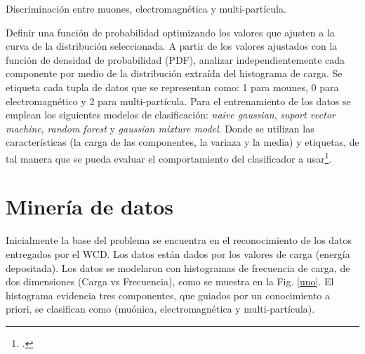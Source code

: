 \begin{algorithm}[h]
\small
\caption{Discriminación entre muones, electromagnética y multi-partícula.}
\label{Begin_Read}
\begin{algorithmic}[1]
\State Definir una función de probabilidad optimizando los valores que ajusten a la curva de la distribución seleccionada.
\State A partir de los valores ajustados con la función de densidad de probabilidad (PDF), analizar independientemente cada componente por medio de la distribución extraída del histograma de carga.
\State Se etiqueta cada tupla de datos que se  representan como: 1 para mounes, 0 para electromagnético y 2 para multi-partícula.
\State Para el entrenamiento de los datos se emplean los siguientes modelos de clasificación: \textit{naive gaussian}, \textit{suport vector machine}, \textit{random forest} y \textit{gaussian mixture model}. Donde se utilizan las características (la carga de las componentes, la variaza y la media) y etiquetas, de tal manera que se pueda evaluar el comportamiento del clasificador a usar\footcite{perez2005modelos}.
\Statex
\end{algorithmic}
  \vspace{-0.1cm}%
\end{algorithm}


\section{Minería de datos}
Inicialmente la base del problema se encuentra en el reconocimiento de los datos entregados por el WCD. Los datos están dados por los valores de carga (energía depositada). Los datos se modelaron con histogramas de frecuencia de carga, de dos dimensiones (Carga vs Frecuencia), como se muestra en la Fig. \ref{uno}. El histograma evidencia tres componentes, que guiados por un conocimiento a priori, se clasifican como (muónica, electromagnética y multi-partícula).\\



